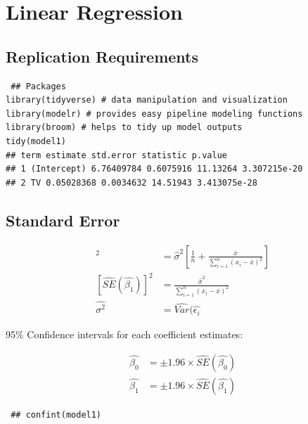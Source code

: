 \documentclass[12pt, oneside]{article}
\newcommand*{\barx}{\overline x}
\begin{document}
\section{Linear Regression}

\subsection{Replication Requirements}
 \begin{lstlisting}
 ## Packages
library(tidyverse) # data manipulation and visualization
library(modelr) # provides easy pipeline modeling functions
library(broom) # helps to tidy up model outputs
tidy(model1)
## term estimate std.error statistic p.value
## 1 (Intercept) 6.76409784 0.6075916 11.13264 3.307215e-20
## 2 TV 0.05028368 0.0034632 14.51943 3.413075e-28
 \end{lstlisting}

\subsection{Standard Error}
\begin{align*}
    [\widehat{SE}(\hat{\beta_0})]^2 &= \hat{\sigma}^2 \left[\frac{1}{n} + \frac{\barx}{\sum^n_{i=1} (x_i - \barx)^2} \right]\\
    [\widehat{SE}(\hat{\beta_1})]^2 &= \frac{\hat{\sigma}^2}{\sum^n_{i=1} (x_i - \barx)^2} \\
    \hat{\sigma^2} &= \widehat{Var}(\hat{\epsilon_i}
 \end{align*}
 
 95\% Confidence intervals for each coefficient estimates:
 
 \begin{align*}
     \hat{\beta_0} &= \pm 1.96 \times  \widehat{SE}(\hat{\beta_0}) \\
     \hat{\beta_1} &= \pm 1.96 \times  \widehat{SE}(\hat{\beta_1})
 \end{align*}

\begin{lstlisting}
 ## confint(model1)
\end{lstlisting}
\end{document}

